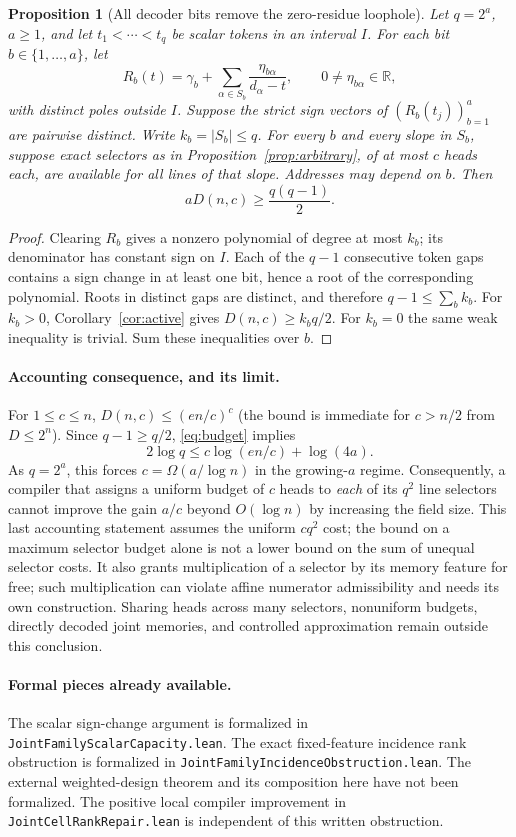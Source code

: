 \documentclass[11pt]{article}
\newtheorem{proposition}{Proposition}
\newcommand{\RR}{\mathbb R}
\begin{document}
\begin{proposition}[All decoder bits remove the zero-residue loophole]
Let $q=2^a$, $a\geq1$, and let $t_1<\cdots<t_q$ be scalar tokens in an
interval $I$. For each bit $b\in\{1,\ldots,a\}$, let
\[
 R_b(t)=\gamma_b+\sum_{\alpha\in S_b}
       \frac{\eta_{b\alpha}}{d_\alpha-t},
 \qquad 0\neq\eta_{b\alpha}\in\RR,
\]
with distinct poles outside $I$. Suppose the strict sign vectors of
$(R_b(t_j))_{b=1}^a$ are pairwise distinct. Write $k_b=|S_b|\leq q$.
For every $b$ and every slope in $S_b$, suppose exact selectors as in
Proposition~\ref{prop:arbitrary}, of at most $c$ heads each, are available
for all lines of that slope. Addresses may depend on $b$. Then
\begin{equation}\label{eq:budget}
 a D(n,c)\geq\frac{q(q-1)}2.
\end{equation}
\end{proposition}
\begin{proof}
Clearing $R_b$ gives a nonzero polynomial of degree at most $k_b$; its
denominator has constant sign on $I$. Each of the $q-1$ consecutive token
gaps contains a sign change in at least one bit, hence a root of the
corresponding polynomial. Roots in distinct gaps are distinct, and
therefore $q-1\leq\sum_b k_b$. For $k_b>0$, Corollary~\ref{cor:active}
gives $D(n,c)\geq k_bq/2$. For $k_b=0$ the same weak inequality is trivial.
Sum these inequalities over $b$.
\end{proof}

\paragraph{Accounting consequence, and its limit.}
For $1\leq c\leq n$, $D(n,c)\leq(en/c)^c$ (the bound is immediate for
$c>n/2$ from $D\leq2^n$). Since $q-1\geq q/2$, \eqref{eq:budget} implies
\[
 2\log q\leq c\log(en/c)+\log(4a).
\]
As $q=2^a$, this forces $c=\Omega(a/\log n)$ in the growing-$a$ regime.
Consequently, a compiler that assigns a uniform budget of $c$ heads to
\emph{each} of its $q^2$ line selectors cannot improve the gain
$a/c$ beyond $O(\log n)$ by increasing the field size. This last accounting
statement assumes the uniform $cq^2$ cost; the bound on a maximum selector
budget alone is not a lower bound on the sum of unequal selector costs.
It also grants multiplication of a selector by its memory feature for free;
such multiplication can violate affine numerator admissibility and needs
its own construction. Sharing heads across many selectors, nonuniform
budgets, directly decoded joint memories, and controlled approximation
remain outside this conclusion.

\paragraph{Formal pieces already available.}
The scalar sign-change argument is formalized in
\texttt{JointFamilyScalarCapacity.lean}. The exact fixed-feature incidence
rank obstruction is formalized in \texttt{JointFamilyIncidenceObstruction.lean}.
The external weighted-design theorem and its composition here have not been
formalized. The positive local compiler improvement in
\texttt{JointCellRankRepair.lean} is independent of this written obstruction.
\end{document}
